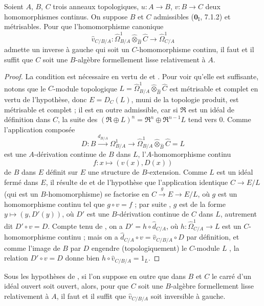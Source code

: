 \begin{proposition}[20.7.18]
\label{0.20.7.18-fr}
Soient $A$, $B$, $C$ trois anneaux topologiques, $u:A\to B$, $v:B\to C$
deux homomorphismes continus. On suppose $B$ et $C$ admissibles
($\mathbf{0}_{\mathrm I}$, 7.1.2) et métrisables. Pour que l'homomorphisme
canonique
\[
  \widehat v_{C/B/A}:\widehat{\Omega}^1_{B/A}
  \widehat\otimes_{\widehat B}\widehat C\to\widehat{\Omega}^1_{C/A}
\]
admette un inverse à gauche qui soit un $C$-homomorphisme continu, il faut et
il suffit que $C$ soit une $B$-algèbre formellement lisse relativement à $A$.
\end{proposition}

\begin{proof}
La condition est nécessaire en vertu de  et
. Pour voir qu'elle est suffisante, notons que le $C$-module
topologique
$L=\widehat{\Omega}^1_{B/A}\widehat\otimes_{\widehat B}\widehat C$ est
métrisable et
complet en vertu de l'hypothèse, donc $E=D_C(L)$, muni de la topologie produit,
est métrisable et complet ; il est en outre admissible, car si $\mathfrak{R}$
est un idéal de définition dans $C$, la suite des
$(\mathfrak{R}\oplus L)^n=\mathfrak{R}^n\oplus\mathfrak{R}^{n-1}L$ tend vers
$0$. Comme l'application composée
\[
  D:B\xrightarrow{d_{B/A}}\Omega^1_{B/A}\to
  \widehat{\Omega}^1_{B/A}\widehat\otimes_{\widehat B}\widehat C=L
\]
est une $A$-dérivation continue de $B$ dans $L$, l'$A$-homomorphisme continu
\[
  f:x\longmapsto(v(x),D(x))
\]
de $B$ dans $E$ définit sur $E$ une structure de $B$-extension. Comme $L$ est
un idéal fermé dans $E$, il résulte de  et de l'hypothèse
que l'application identique $C\to E/L$ (qui est un $B$-homomorphisme) se
factorise en $C\xrightarrow{g}E\to E/L$, où $g$ est un homomorphisme continu
tel que $g\circ v=f$ ; par suite , $g$ est de la forme
$y\mapsto(y,D'(y))$, où $D'$ est une $B$-dérivation continue de $C$ dans $L$,
autrement dit $D'\circ v=D$. Compte tenu de , on a
$D'=h\circ\widehat d_{C/A}$, où
$h:\widehat{\Omega}^1_{C/A}\to L$ est un $C$-homomorphisme continu ; mais on
a $\widehat d_{C/A}\circ v=\widehat v_{C/B/A}\circ D$ par définition, et
comme l'image de $B$ par $D$ engendre (topologiquement) le $C$-module $L$
, la relation $D'\circ v=D$ donne bien
$h\circ\widehat v_{C/B/A}=1_L$.
\end{proof}

\begin{corollary}[20.7.19]
\label{0.20.7.19-fr}
Sous les hypothèses de , si l'on suppose en outre que dans
$B$ et $C$ le carré d'un idéal ouvert soit ouvert, alors, pour que $C$ soit
une $B$-algèbre formellement lisse relativement à $A$, il faut et il suffit
que $\widehat v_{C/B/A}$ soit inversible à gauche.
\end{corollary}

